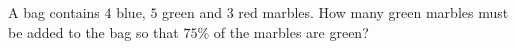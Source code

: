 A bag contains $4$ blue, $5$ green and $3$ red marbles. How many green marbles must be added to the bag so that $75\%$ of the marbles are green?

